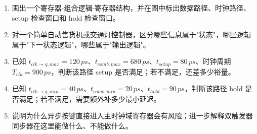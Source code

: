 \documentclass[11pt,a4paper]{article}
\begin{document}
\begin{enumerate}
  \item 画出一个寄存器-组合逻辑-寄存器结构，并在图中标出数据路径、时钟路径、setup 检查窗口和 hold 检查窗口。
  \item 对一个简单自动售货机或交通灯控制器，区分哪些信息属于"状态"，哪些逻辑属于"下一状态逻辑"，哪些属于"输出逻辑"。
  \item 已知 \(t_{clk\rightarrow q,max}=120\,ps\)、\(t_{comb,max}=680\,ps\)、\(t_{setup}=80\,ps\)、时钟周期 \(T_{clk}=900\,ps\)，判断该路径 setup 是否满足；若不满足，还差多少裕量。
  \item 已知 \(t_{clk\rightarrow q,min}=40\,ps\)、\(t_{comb,min}=20\,ps\)、\(t_{hold}=90\,ps\)，判断该路径 hold 是否满足；若不满足，需要额外补多少最小延迟。
  \item 说明为什么异步按键直接进入主时钟域寄存器会有风险；进一步解释双触发器同步器在这里能做什么、不能做什么。
\end{enumerate}
\end{document}
